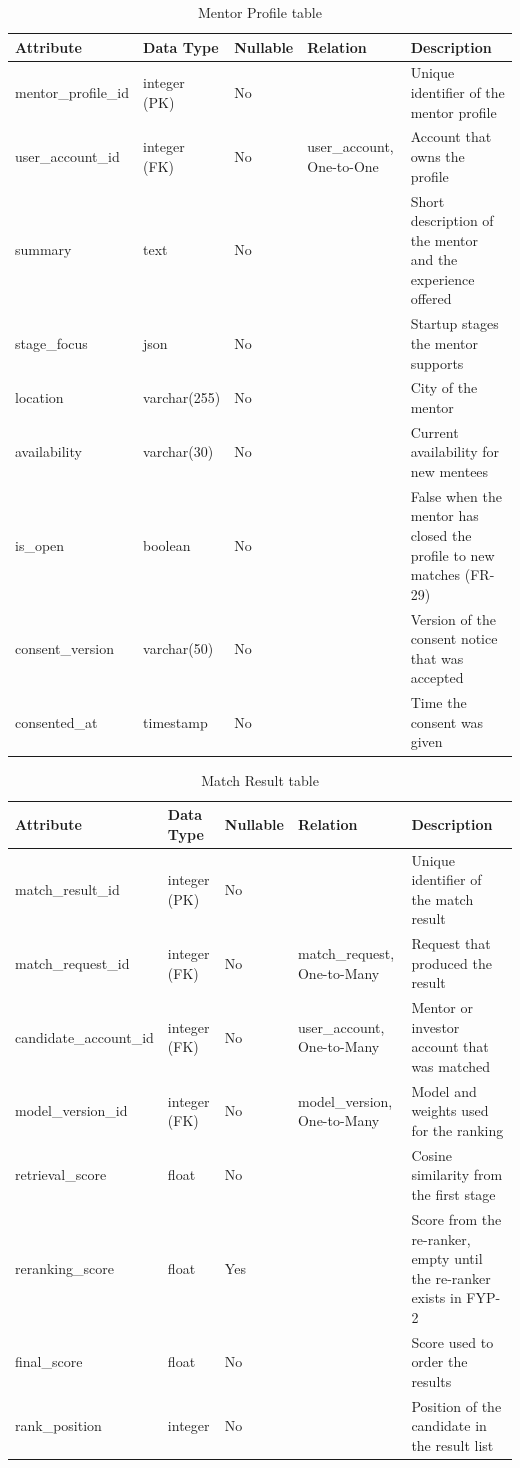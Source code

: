 \documentclass{FastFyp}
\newcommand{\ddhead}{\hline \textbf{Attribute} & \textbf{Data Type} & \textbf{Nullable} & \textbf{Relation} & \textbf{Description} \\ \hline}
\begin{document}
\begin{table}[!ht]
\centering
\caption{Mentor Profile table}
\label{tab:dd-mentor-profile}
\begin{tabular}{|p{3.2cm}|p{2.5cm}|p{1.4cm}|p{2.9cm}|p{4.0cm}|}
\ddhead
mentor\_profile\_id & integer (PK) & No &  & Unique identifier of the mentor profile \\ \hline
user\_account\_id & integer (FK) & No & user\_account, One-to-One & Account that owns the profile \\ \hline
summary & text & No &  & Short description of the mentor and the experience offered \\ \hline
stage\_focus & json & No &  & Startup stages the mentor supports \\ \hline
location & varchar(255) & No &  & City of the mentor \\ \hline
availability & varchar(30) & No &  & Current availability for new mentees \\ \hline
is\_open & boolean & No &  & False when the mentor has closed the profile to new matches (FR-29) \\ \hline
consent\_version & varchar(50) & No &  & Version of the consent notice that was accepted \\ \hline
consented\_at & timestamp & No &  & Time the consent was given \\ \hline
\end{tabular}
\end{table}

\begin{table}[!ht]
\centering
\caption{Match Result table}
\label{tab:dd-match-result}
\begin{tabular}{|p{3.2cm}|p{2.5cm}|p{1.4cm}|p{2.9cm}|p{4.0cm}|}
\ddhead
match\_result\_id & integer (PK) & No &  & Unique identifier of the match result \\ \hline
match\_request\_id & integer (FK) & No & match\_request, One-to-Many & Request that produced the result \\ \hline
candidate\_account\_id & integer (FK) & No & user\_account, One-to-Many & Mentor or investor account that was matched \\ \hline
model\_version\_id & integer (FK) & No & model\_version, One-to-Many & Model and weights used for the ranking \\ \hline
retrieval\_score & float & No &  & Cosine similarity from the first stage \\ \hline
reranking\_score & float & Yes &  & Score from the re-ranker, empty until the re-ranker exists in FYP-2 \\ \hline
final\_score & float & No &  & Score used to order the results \\ \hline
rank\_position & integer & No &  & Position of the candidate in the result list \\ \hline
\end{tabular}
\end{table}
\end{document}
